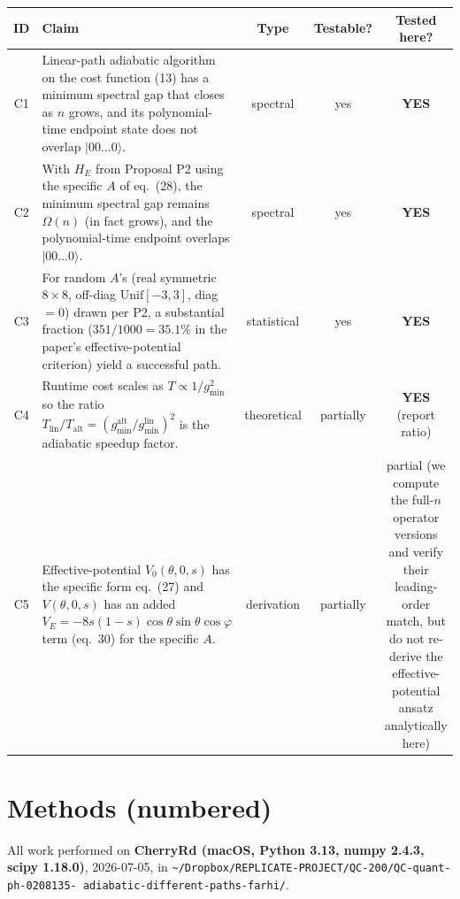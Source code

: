\documentclass[11pt]{article}
\begin{document}
\begin{center}\small
\begin{longtable}{|c|p{6.5cm}|c|c|c|}
\hline
\textbf{ID} & \textbf{Claim} & \textbf{Type} & \textbf{Testable?} & \textbf{Tested here?} \\ \hline
C1 & Linear-path adiabatic algorithm on the cost function (13) has a
     minimum spectral gap that closes as $n$ grows, and its polynomial-time
     endpoint state does not overlap $|00\dots0\rangle$. & spectral & yes & \textbf{YES} \\ \hline
C2 & With $H_E$ from Proposal P2 using the specific $A$ of eq.\ (28), the
     minimum spectral gap remains $\Omega(n)$ (in fact grows), and the
     polynomial-time endpoint overlaps $|00\dots0\rangle$. & spectral & yes & \textbf{YES} \\ \hline
C3 & For random $A$'s (real symmetric $8\times 8$, off-diag $\mathrm{Unif}[-3,3]$,
     diag $=0$) drawn per P2, a substantial fraction ($351/1000 = 35.1\%$ in the
     paper's effective-potential criterion) yield a successful path. & statistical & yes & \textbf{YES} \\ \hline
C4 & Runtime cost scales as $T \propto 1/g_{\min}^2$ so the ratio
     $T_{\text{lin}}/T_{\text{alt}} = (g_{\min}^{\text{alt}}/g_{\min}^{\text{lin}})^2$
     is the adiabatic speedup factor. & theoretical & partially & \textbf{YES} (report ratio) \\ \hline
C5 & Effective-potential $V_0(\theta, 0, s)$ has the specific form eq.\ (27)
     and $V(\theta, 0, s)$ has an added $V_E = -8s(1-s)\cos\theta \sin\theta \cos\varphi$
     term (eq.\ 30) for the specific $A$. & derivation & partially & partial (we compute the full-$n$ operator versions and verify their leading-order match, but do not re-derive the effective-potential ansatz analytically here) \\ \hline
\end{longtable}
\end{center}

\section{Methods (numbered)}

All work performed on \textbf{CherryRd (macOS, Python 3.13, numpy 2.4.3, scipy 1.18.0)},
2026-07-05, in
\texttt{\textasciitilde/Dropbox/REPLICATE-PROJECT/QC-200/QC-quant-ph-0208135-\allowbreak
adiabatic-different-paths-farhi/}.
\end{document}
